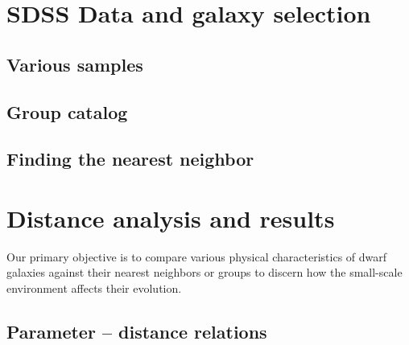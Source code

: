 \section[Data]{SDSS Data and galaxy selection}




\subsection{Various samples}



\subsection{Group catalog}

\cite{Berlind06}


\subsection{Finding the nearest neighbor}




\section[Results]{Distance analysis and results}

Our primary objective is to compare various physical characteristics of dwarf 
galaxies against their nearest neighbors or groups to discern how the 
small-scale environment affects their evolution.


\subsection{Parameter -- distance relations}\label{sec:Relations}

